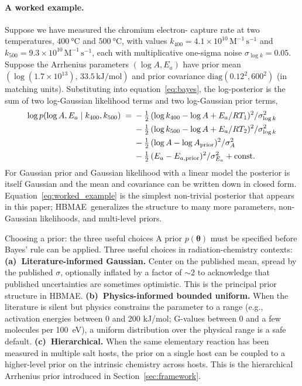 \documentclass[12pt]{article}
\theoremstyle{plain}
\theoremstyle{definition}
\theoremstyle{remark}
\newcommand{\HBMAE}{HBMAE\xspace}
\begin{document}
\paragraph{A worked example.}  Suppose we have measured the chromium electron-
capture rate at two temperatures, $\SI{400}{\celsius}$ and $\SI{500}{\celsius}$,
with values $k_{400} = 4.1\times 10^{10}\,\mathrm{M}^{-1}\,\mathrm{s}^{-1}$ and
$k_{500} = 9.3\times 10^{10}\,\mathrm{M}^{-1}\,\mathrm{s}^{-1}$, each with
multiplicative one-sigma noise $\sigma_{\log k} = 0.05$.  Suppose the Arrhenius
parameters $(\log A, E_a)$ have prior mean $(\log(1.7\times 10^{13}),\,
33.5\,\mathrm{kJ/mol})$ and prior covariance $\mathrm{diag}(0.12^2, 600^2)$
(in matching units).  Substituting into equation~\eqref{eq:bayes}, the
log-posterior is the sum of two log-Gaussian likelihood terms and two
log-Gaussian prior terms,
%
\begin{align}
  \log p(\log A, E_a \mid k_{400}, k_{500}) \;=\;
  &-\tfrac{1}{2}\,(\log k_{400} - \log A + E_a/RT_1)^2/\sigma_{\log k}^2 \notag\\
  &-\tfrac{1}{2}\,(\log k_{500} - \log A + E_a/RT_2)^2/\sigma_{\log k}^2 \notag\\
  &-\tfrac{1}{2}\,(\log A - \log A_{\mathrm{prior}})^2/\sigma_A^2 \notag\\
  &-\tfrac{1}{2}\,(E_a - E_{a,\mathrm{prior}})^2/\sigma_{E_a}^2
  + \mathrm{const}.
  \label{eq:worked_example}
\end{align}
%
For Gaussian prior and Gaussian likelihood with a linear model the posterior
is itself Gaussian and the mean and covariance can be written down in closed
form.  Equation~\eqref{eq:worked_example} is the simplest non-trivial
posterior that appears in this paper; \HBMAE\ generalizes the structure to
many more parameters, non-Gaussian likelihoods, and multi-level priors.

\begin{tutorialbox}{Choosing a prior:  the three useful choices}
A prior $p(\boldsymbol{\theta})$ must be specified before Bayes' rule can be
applied.  Three useful choices in radiation-chemistry contexts:
\textbf{(a)~Literature-informed Gaussian.}  Center on the published mean,
spread by the published $\sigma$, optionally inflated by a factor of $\sim 2$
to acknowledge that published uncertainties are sometimes optimistic.  This
is the principal prior structure in \HBMAE.
\textbf{(b)~Physics-informed bounded uniform.}  When the literature is silent
but physics constrains the parameter to a range (e.g., activation energies
between 0 and 200 kJ/mol; G-values between 0 and a few molecules per
\SI{100}{eV}), a uniform distribution over the physical range is a safe
default.
\textbf{(c)~Hierarchical.}  When the same elementary reaction has been
measured in multiple salt hosts, the prior on a single host can be coupled
to a higher-level prior on the intrinsic chemistry across hosts.  This is
the hierarchical Arrhenius prior introduced in Section~\ref{sec:framework}.
\end{tutorialbox}
\end{document}

